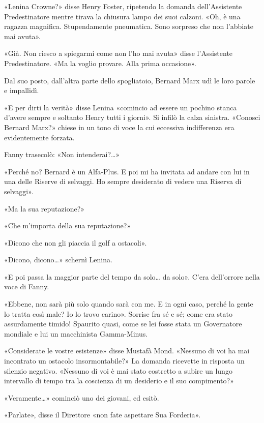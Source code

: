 \documentclass[
a5paper, %
10pt, %
twoside, 
onecolumn, %
openany, %
]{memoir}
\renewenvironment{shaded}{%
  \def\FrameCommand{\fboxsep=\FrameSep \colorbox{shadecolor}}%
  \MakeFramed{\advance\hsize-\width \FrameRestore\FrameRestore}}%
 {\endMakeFramed}
\begin{document}
\begin{shaded}
    «Lenina Crowne?» disse Henry Foster, ripetendo la domanda dell’Assistente Predestinatore mentre tirava la chiusura lampo dei suoi calzoni. «Oh, è una ragazza magnifica. Stupendamente pneumatica. Sono sorpreso che non l’abbiate mai avuta».

«Già. Non riesco a spiegarmi come non l’ho mai avuta» disse l’Assistente Predestinatore. «Ma la voglio provare. Alla prima occasione».

Dal suo posto, dall’altra parte dello spogliatoio, Bernard Marx udì le loro parole e impallidì.

    «E per dirti la verità» disse Lenina «comincio ad essere un pochino stanca d’avere sempre e soltanto Henry tutti i giorni». Si infilò la calza sinistra. «Conosci Bernard Marx?» chiese in un tono di voce la cui eccessiva indifferenza era evidentemente forzata.

Fanny trasecolò: «Non intenderai?…»

«Perché no? Bernard è un Alfa-Plus. E poi mi ha invitata ad andare con lui in una delle Riserve di selvaggi. Ho sempre desiderato di vedere una Riserva di selvaggi».

«Ma la sua reputazione?»

«Che m’importa della sua reputazione?»

«Dicono che non gli piaccia il golf a ostacoli».

«Dicono, dicono…» schernì Lenina.

«E poi passa la maggior parte del tempo da solo… da solo». C’era dell’orrore nella voce di Fanny.

«Ebbene, non sarà più solo quando sarà con me. E in ogni caso, perché la gente lo tratta così male? Io lo trovo carino». Sorrise fra sé e sé; come era stato assurdamente timido! Spaurito quasi, come se lei fosse stata un Governatore mondiale e lui un macchinista Gamma-Minus.
\end{shaded}

«Considerate le vostre esistenze» disse Mustafà Mond. «Nessuno di voi ha mai incontrato un ostacolo insormontabile?» La domanda ricevette in risposta un silenzio negativo. «Nessuno di voi è mai stato costretto a subire un lungo intervallo di tempo tra la coscienza di un desiderio e il suo compimento?»

«Veramente…» cominciò uno dei giovani, ed esitò.

«Parlate», disse il Direttore «non fate aspettare Sua Forderia».
\end{document}
